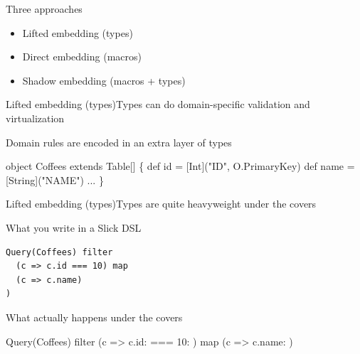 \documentclass{beamer}
\begin{document}
\begin{frame}{Three approaches}
  \begin{itemize}
  \item Lifted embedding (types)
  \item Direct embedding (macros)
  \item Shadow embedding (macros + types)
  \end{itemize}
\end{frame}

\begin{frame}[fragile]{Lifted embedding (types)}{Types can do domain-specific validation and virtualization}
  \vspace{1em}
  \begin{exampleblock}{Domain rules are encoded in an extra layer of types}
  \begin{semiverbatim}
object Coffees extends Table[\text{\color{blue}{(Int, String, ...)}}] \{
  def id = \text{\color{blue}{column}}[Int]("ID", O.PrimaryKey)
  def name = \text{\color{blue}{column}}[String]("NAME")
  ...
\}
  \end{semiverbatim}
  \end{exampleblock}
\end{frame}

\begin{frame}[fragile]{Lifted embedding (types)}{Types are quite heavyweight under the covers}
  \vspace{1em}
  \begin{exampleblock}{What you write in a Slick DSL}
    \begin{verbatim}
Query(Coffees) filter
  (c => c.id === 10) map
  (c => c.name)
)\end{verbatim}
  \end{exampleblock}

  \vspace{1em}
  \begin{alertblock}{What actually happens under the covers}
    \begin{semiverbatim}
Query(Coffees) filter
  (c => c.id: \text{\color{blue}{Column[Int]}} === 10: \text{\color{blue}{Column[Int]}}) map
  (c => c.name: \text{\color{blue}{Column[String]}})
    \end{semiverbatim}
  \end{alertblock}
\end{frame}
\end{document}
